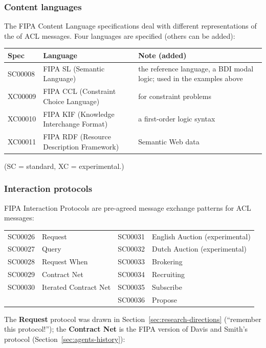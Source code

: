 \subsubsection{Content languages}

The FIPA Content Language specifications deal with different representations of the
 of ACL messages. Four languages are specified (others can be added):
\begin{center}
\small
\begin{tabularx}{\linewidth}{@{}l >{\raggedright\arraybackslash}p{4.6cm} X@{}}
\toprule
\textbf{Spec} & \textbf{Language} & \textbf{Note (added)} \\
\midrule
SC00008 & FIPA SL (Semantic Language) & the reference language, a BDI modal logic; used in the examples above \\
XC00009 & FIPA CCL (Constraint Choice Language) & for constraint problems \\
XC00010 & FIPA KIF (Knowledge Interchange Format) & a first-order logic syntax \\
XC00011 & FIPA RDF (Resource Description Framework) & Semantic Web data \\
\bottomrule
\end{tabularx}
\end{center}
(SC = standard, XC = experimental.)

\subsubsection{Interaction protocols}

FIPA Interaction Protocols are pre-agreed message exchange patterns for ACL messages:
\begin{center}
\small
\begin{tabular}{@{}ll|ll@{}}
\toprule
SC00026 & Request & SC00031 & English Auction (experimental) \\
SC00027 & Query & SC00032 & Dutch Auction (experimental) \\
SC00028 & Request When & SC00033 & Brokering \\
SC00029 & Contract Net & SC00034 & Recruiting \\
SC00030 & Iterated Contract Net & SC00035 & Subscribe \\
 & & SC00036 & Propose \\
\bottomrule
\end{tabular}
\end{center}
The \textbf{Request} protocol was drawn in Section~\ref{sec:research-directions} (``remember
this protocol!''); the \textbf{Contract Net} is the FIPA version of Davis and Smith's protocol
(Section~\ref{sec:agents-history}):

